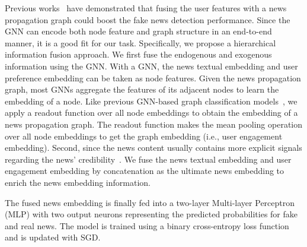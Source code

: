 \documentclass[sigconf]{acmart}
\begin{document}
Previous works~\cite{lu2020gcan, monti2019fake, han2020graph} have demonstrated that fusing the user features with a news propagation graph could boost the fake news detection performance.
Since the GNN can encode both node feature and graph structure in an end-to-end manner, it is a good fit for our task.
Specifically, we propose a hierarchical information fusion approach.
We first fuse the endogenous and exogenous information using the GNN.
With a GNN, the news textual embedding and user preference embedding can be taken as node features.
Given the news propagation graph, most GNNs aggregate the features of its adjacent nodes to learn the embedding of a node.
Like previous GNN-based graph classification models~\cite{xu2018powerful, ying2018hierarchical}, we apply a readout function over all node embeddings to obtain the embedding of a news propagation graph.
The readout function makes the mean pooling operation over all node embeddings to get the graph embedding (i.e., user engagement embedding).
Second, since the news content usually contains more explicit signals regarding the news' credibility~\cite{chandra2020graph}.
We fuse the news textual embedding and user engagement embedding by concatenation as the ultimate news embedding to enrich the news embedding information.

The fused news embedding is finally fed into a two-layer Multi-layer Perceptron (MLP) with two output neurons representing the predicted probabilities for fake and real news.
The model is trained using a binary cross-entropy loss function and is updated with SGD.
\end{document}
